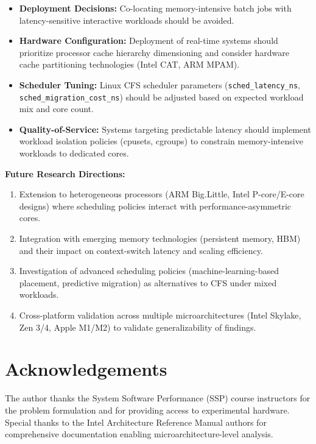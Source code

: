 \documentclass[conference]{IEEEtran}
\begin{document}
\begin{itemize}
  \item \textbf{Deployment Decisions:} Co-locating memory-intensive batch jobs
        with latency-sensitive interactive workloads should be avoided.
  
  \item \textbf{Hardware Configuration:} Deployment of real-time systems should
        prioritize processor cache hierarchy dimensioning and consider hardware
        cache partitioning technologies (Intel CAT, ARM MPAM).
  
  \item \textbf{Scheduler Tuning:} Linux CFS scheduler parameters
        (\texttt{sched\_latency\_ns}, \texttt{sched\_migration\_cost\_ns})
        should be adjusted based on expected workload mix and core count.
  
  \item \textbf{Quality-of-Service:} Systems targeting predictable latency
        should implement workload isolation policies (cpusets, cgroups) to
        constrain memory-intensive workloads to dedicated cores.
\end{itemize}

\textbf{Future Research Directions:}

\begin{enumerate}
  \item Extension to heterogeneous processors (ARM Big.Little, Intel P-core/E-core
        designs) where scheduling policies interact with performance-asymmetric
        cores.
  
  \item Integration with emerging memory technologies (persistent memory, HBM)
        and their impact on context-switch latency and scaling efficiency.
  
  \item Investigation of advanced scheduling policies (machine-learning-based
        placement, predictive migration) as alternatives to CFS under mixed
        workloads.
  
  \item Cross-platform validation across multiple microarchitectures (Intel Skylake,
        Zen 3/4, Apple M1/M2) to validate generalizability of findings.
\end{enumerate}

\section*{Acknowledgements}
The author thanks the System Software Performance (SSP) course instructors
for the problem formulation and for providing access to experimental hardware.
Special thanks to the Intel Architecture Reference Manual authors for
comprehensive documentation enabling microarchitecture-level analysis.
\end{document}
